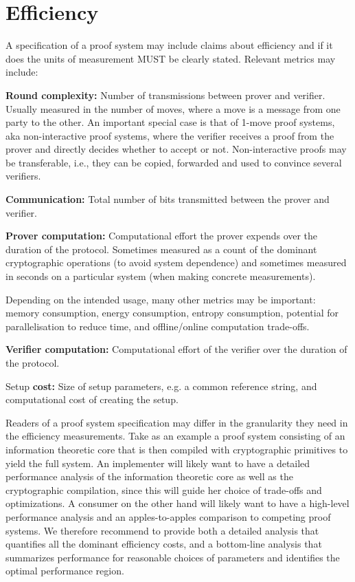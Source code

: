 \vspace{-.5em}  %
\section{Efficiency}
\label{security:Efficiency}
\vspace{-.35em}  %

A specification of a proof system may include claims about efficiency and if it does the units of measurement MUST be clearly stated. Relevant metrics may include:

\begin{bulletize}
    \item \textbf{Round complexity:} Number of transmissions between prover and verifier. Usually measured in the number of moves, where a move is a message from one party to the other.
An important special case is that of 1-move proof systems, aka non-interactive proof systems, where the verifier receives a proof from the prover and directly decides whether to accept or not. Non-interactive proofs may be transferable, i.e., they can be copied, forwarded and used to convince several verifiers.
    \item \textbf{Communication:} Total number of bits transmitted between the prover and verifier.
    \item \textbf{Prover computation:} Computational effort the prover expends over the duration of the protocol. Sometimes measured as a count of the dominant cryptographic operations (to avoid system dependence) and sometimes measured in seconds on a particular system (when making concrete measurements).
    \item Depending on the intended usage, many other metrics may be important: memory consumption, energy consumption, entropy consumption, potential for parallelisation to reduce time, and offline/online computation trade-offs.
    \item \textbf{Verifier computation:} Computational effort of the verifier over the duration of the protocol.
    \item Setup \textbf{cost:} Size of setup parameters, e.g. a common reference string, and computational cost of creating the setup.
\end{bulletize} 

Readers of a proof system specification may differ in the granularity they need in the efficiency measurements. Take as an example a proof system consisting of an information theoretic core that is then compiled with cryptographic primitives to yield the full system. An implementer will likely want to have a detailed performance analysis of the information theoretic core as well as the cryptographic compilation, since this will guide her choice of trade-offs and optimizations. A consumer on the other hand will likely want to have a high-level performance analysis and an apples-to-apples comparison to competing proof systems. We therefore recommend to provide both a detailed analysis that quantifies all the dominant efficiency costs, and a bottom-line analysis that summarizes performance for reasonable choices of parameters and identifies the optimal performance region.
\loosen


